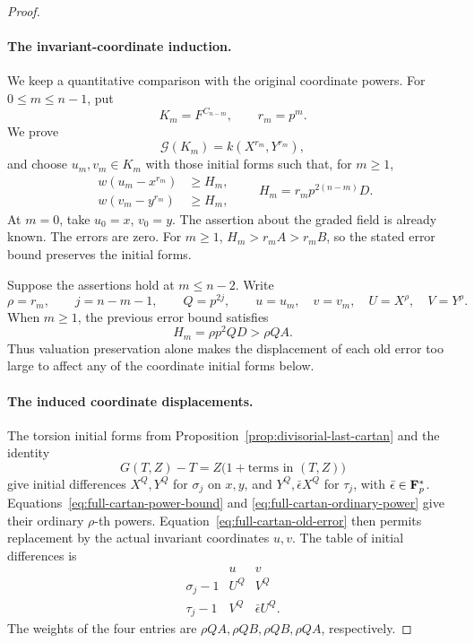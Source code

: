 \begin{proof}
\paragraph{The invariant-coordinate induction.}
We keep a quantitative comparison with the original coordinate powers. For $0\le m\le n-1$, put
\[
 K_m=F^{C_{n-m}},\qquad r_m=p^m.
\]
We prove
\begin{equation}\label{eq:full-cartan-induction-field}
 \mathcal G(K_m)=k(X^{r_m},Y^{r_m}),
\end{equation}
and choose $u_m,v_m\in K_m$ with those initial forms such that, for $m\ge1$,
\begin{equation}\label{eq:full-cartan-induction-error}
 \begin{split}
 w(u_m-x^{r_m})&\ge H_m,\\
 w(v_m-y^{r_m})&\ge H_m,
 \end{split}
 \qquad H_m=r_m p^{2(n-m)}D.
\end{equation}
At $m=0$, take $u_0=x$, $v_0=y$. The assertion about the graded field is already known. The errors are zero. For $m\ge1$, $H_m>r_mA>r_mB$, so the stated error bound preserves the initial forms.

Suppose the assertions hold at $m\le n-2$. Write
\[
 \rho=r_m,\qquad j=n-m-1,\qquad Q=p^{2j},
 \qquad u=u_m,\quad v=v_m,\quad U=X^{\rho},\quad V=Y^{\rho}.
\]
When $m\ge1$, the previous error bound satisfies
\begin{equation}\label{eq:full-cartan-old-error}
 H_m=\rho p^2QD>\rho QA.
\end{equation}
Thus valuation preservation alone makes the displacement of each old error too large to affect any of the coordinate initial forms below.

\paragraph{The induced coordinate displacements.}
The torsion initial forms from Proposition~\ref{prop:divisorial-last-cartan} and the identity
\[
 G(T,Z)-T=Z\bigl(1+\text{terms in }(T,Z)\bigr)
\]
give initial differences $X^Q,Y^Q$ for $\sigma_j$ on $x,y$, and $Y^Q,\bar\epsilon X^Q$ for $\tau_j$, with $\bar\epsilon\in\mathbf F_p^*$. Equations~\eqref{eq:full-cartan-power-bound} and \eqref{eq:full-cartan-ordinary-power} give their ordinary $\rho$-th powers. Equation~\eqref{eq:full-cartan-old-error} then permits replacement by the actual invariant coordinates $u,v$. The table of initial differences is
\begin{equation}\label{eq:full-cartan-displacements}
 \begin{array}{c|cc}
       &u&v\\ \hline
 \sigma_j-1&U^Q&V^Q\\
 \tau_j-1&V^Q&\bar\epsilon U^Q .
 \end{array}
\end{equation}
The weights of the four entries are $\rho QA,\rho QB,\rho QB,\rho QA$, respectively.


\end{proof}
